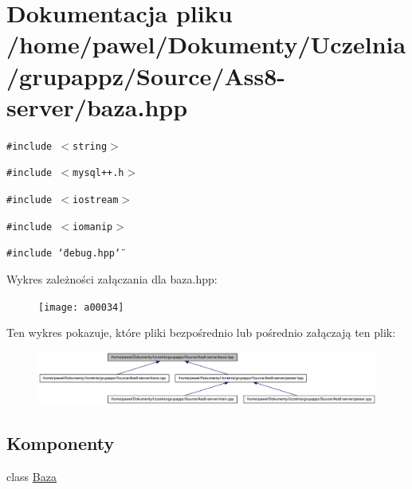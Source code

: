 \hypertarget{a00007}{
\section{Dokumentacja pliku /home/pawel/Dokumenty/Uczelnia/grupappz/Source/Ass8-server/baza.hpp}
\label{a00007}
}
{\tt \#include $<$string$>$}\par
{\tt \#include $<$mysql++.h$>$}\par
{\tt \#include $<$iostream$>$}\par
{\tt \#include $<$iomanip$>$}\par
{\tt \#include \char`\"{}debug.hpp\char`\"{}}\par


Wykres zależności załączania dla baza.hpp:\nopagebreak
\begin{figure}[H]
\begin{center}
\leavevmode
\texttt{[image: a00034]}
\end{center}
\end{figure}


Ten wykres pokazuje, które pliki bezpośrednio lub pośrednio załączają ten plik:\nopagebreak
\begin{figure}[H]
\begin{center}
\leavevmode
\includegraphics[width=420pt]{a00035}
\end{center}
\end{figure}
\subsection*{Komponenty}
\begin{CompactItemize}
\item 
class \hyperlink{a00001}{Baza}
\end{CompactItemize}
